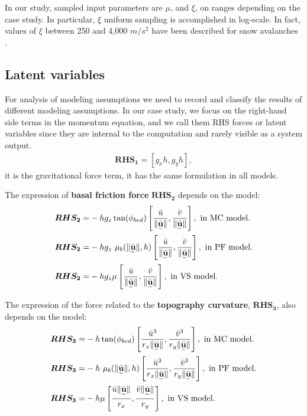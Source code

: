 \documentclass{article}
\begin{document}
In our study, sampled input parameters are $\mu$, and $\xi$, on ranges depending on the case study. In particular, $\xi$ uniform sampling is accomplished in log-scale. In fact, values of $\xi$ between 250 and 4,000 $m/s^2$ have been described for snow avalanches \citep{Salm1993,Bartelt1999,Gruber2007}.

\subsection{Latent variables}\label{sec:Fterms}
For analysis of modeling assumptions we need to record and classify the results of different modeling assumptions. In our case study, we focus on the right-hand side terms in the momentum equation, and we call them RHS forces or latent variables since they are internal to the computation and rarely visible as a system output.
\begin{align}
\boldsymbol{RHS_1} = [g_x h,g_y h],
\end{align}
it is the gravitational force term, it has the same formulation in all models.

The expression of {\bf basal friction force} $\boldsymbol{RHS_2}$ depends on the model:
\begin{align}
\boldsymbol{RHS_2} =& -h g_z\tan(\phi_{bed})\left[\frac{\bar{u}}{\| \underset{^\sim}{\bar{\textbf u}} \|}, \frac{\bar{v}}{\| \underset{^\sim}{\bar{\textbf u}} \|} \right],\textmd{ in MC model.}\nonumber\\
\boldsymbol{RHS_2} =& - h g_z \ \mu_{b}(\|\underset{^\sim}{\bar{\textbf{u}}} \| , h)\left[\frac{\bar{u}}{\| \underset{^\sim}{\bar{\textbf{u}}} \|}, \frac{\bar{v}}{\| \underset{^\sim}{\bar{\textbf{u}}} \|}\right],\textmd{ in PF model.}\\
\boldsymbol{RHS_2} =& -h g_{z} \mu\left[\frac{\bar{u}}{\| \underset{^\sim}{\bar{\textbf u}}\|} , \frac{\bar{v}}{\| \underset{^\sim}{\bar{\textbf u}}\|}\right],\textmd{ in VS model.}\nonumber
\end{align}

The expression of the force related to the {\bf topography curvature}, $\boldsymbol{RHS_3}$, also depends on the model:
\begin{align}
\boldsymbol{RHS_3} =&-h \tan(\phi_{bed})\left[\frac{\bar{u}^3}{r_x\| \underset{^\sim}{\bar{\textbf{u}}} \|}, \frac{\bar{v}^3}{r_y\| \underset{^\sim}{\bar{\textbf{u}}} \|}\right],\textmd{ in MC model.}\nonumber\\
\boldsymbol{RHS_3} =& -h\ \mu_{b}(\|\underset{^\sim}{\bar{\textbf{u}}} \|,h)\left[\frac{\bar{u}^3}{r_x\| \underset{^\sim}{\bar{\textbf{u}}} \|}, \frac{\bar{v}^3}{r_y\| \underset{^\sim}{\bar{\textbf{u}}} \|}\right],\textmd{ in PF model.}\\
\boldsymbol{RHS_3} =& -h \mu\left[\frac{\bar{u}\| \underset{^\sim}{\bar{\textbf u}} \|}{r_{x}},\frac{\bar{v}\| \underset{^\sim}{\bar{\textbf u}} \|}{r_{y}}\right],\textmd{ in VS model.}\nonumber
\end{align}
\end{document}
